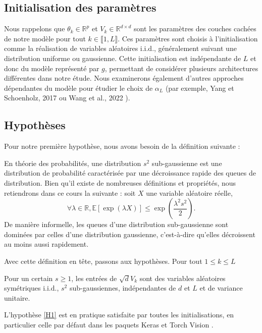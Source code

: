 \subsection{Initialisation des paramètres} 
Nous rappelons que $\theta_k \in \mathbb{R}^p$ et $V_k \in \mathbb{R}^{d \times d}$ sont les paramètres des couches cachées de notre modèle pour tout $k \in \llbracket 1, L \rrbracket$. Ces paramètres sont choisis à l'initialisation comme la réalisation de variables aléatoires i.i.d., généralement suivant une distribution uniforme ou gaussienne. Cette initialisation est indépendante de $L$ et donc du modèle représenté par $g$, permettant de considérer plusieurs architectures différentes dans notre étude. Nous examinerons également d'autres approches dépendantes du modèle pour étudier le choix de $\alpha_L$ (par exemple, Yang et Schoenholz, 2017 ou Wang et al., 2022 \cite{torchvision2016}).

\subsection{Hypothèses}
Pour notre première hypothèse, nous avons besoin de la définition suivante :
\begin{definition}
    En théorie des probabilités, une distribution $s^2$ sub-gaussienne est une distribution de probabilité caractérisée par une décroissance rapide des queues de distribution. Bien qu'il existe de nombreuses définitions et propriétés, nous retiendrons dans ce cours la suivante : soit $X$ une variable aléatoire réelle,
    \[
        \forall \lambda \in \mathbb{R}, \mathbb{E}[\exp(\lambda X)] \leq \exp\left(\frac{\lambda^2 s^2}{2}\right).
    \]
    De manière informelle, les queues d'une distribution sub-gaussienne sont dominées par celles d'une distribution gaussienne, c'est-à-dire qu'elles décroissent au moins aussi rapidement.
\end{definition}

Avec cette définition en tête, passons aux hypothèses. Pour tout $ 1 \leq  k \leq L  $
\begin{assumption}\label{H1}
    Pour un certain $ s \geq 1 $, les entrées de  $ \sqrt{d}V_k $ sont des variables aléatoires symétriques i.i.d., $ s^2 $ sub-gaussiennes, indépendantes de $ d $ et $ L $ et de variance unitaire.
\end{assumption}
\begin{note}
    L'hypothèse \ref{H1} est en pratique satisfaite par toutes les initialisations, en particulier celle par défaut dans les paquets Keras \cite{chollet2015keras} et Torch Vision \cite{torchvision2016}.
\end{note}

